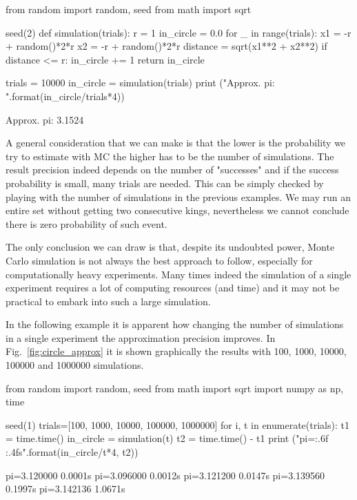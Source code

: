 \begin{ipython}
from random import random, seed
from math import sqrt

seed(2)
def simulation(trials):
  r = 1
  in_circle = 0.0
  for _ in range(trials):
      x1 = -r + random()*2*r
      x2 = -r + random()*2*r
      distance = sqrt(x1**2 + x2**2)
      if distance <= r:
          in_circle += 1
  return in_circle 

trials = 10000
in_circle = simulation(trials)
print ("Approx. pi: {}".format(in_circle/trials*4))  
\end{ipython}
\begin{ioutput}
Approx. pi: 3.1524
\end{ioutput}

A general consideration that we can make is that the lower is the probability we try to estimate with MC the higher has to be the number of simulations. 
The result precision indeed depends on the number of "successes" and if the success probability is small, many trials are needed. This can be simply checked by playing with the number of simulations in the previous examples. We may run an entire set without getting two consecutive kings, nevertheless we cannot conclude there is zero probability of such event.

The only conclusion we can draw is that, despite its undoubted power, Monte Carlo simulation is not always the best approach to follow, especially for computationally heavy experiments. Many times indeed the simulation of a single experiment requires a lot of computing resources (and time) and it may not be practical to embark into such a large simulation.

In the following example it is apparent how changing the number of simulations in a single experiment the approximation precision improves. In Fig.~\ref{fig:circle_approx} it is shown graphically the results with 100, 1000, 10000, 100000 and 1000000 simulations.

\begin{ipython}
from random import random, seed
from math import sqrt
import numpy as np, time

seed(1)
trials=[100, 1000, 10000, 100000, 1000000]
for i, t in enumerate(trials):
    t1 = time.time()
    in_circle = simulation(t)
    t2 = time.time() - t1
    print ("pi={:.6f} {:.4f}s".format(in_circle/t*4, t2))
\end{ipython}
\begin{ioutput}
pi=3.120000 0.0001s
pi=3.096000 0.0012s
pi=3.121200 0.0147s
pi=3.139560 0.1997s
pi=3.142136 1.0671s
\end{ioutput}

